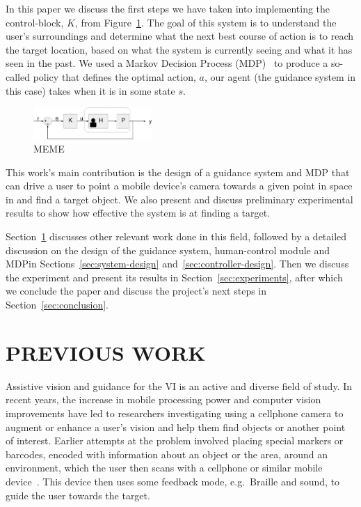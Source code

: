\documentclass[a4paper, twoside]{article}
\begin{document}
In this paper we discuss the first steps we have taken into implementing the control-block, $K$, from Figure~\ref{fig:control-loop}. The goal of this system is to understand the user's surroundings and determine what the next best course of action is to reach the target location, based on what the system is currently seeing and what it has seen in the past. We used a Markov Decision Process (MDP)~\cite{bellman1957markovian} to produce a so-called policy that defines the optimal action, $a$, our agent (the guidance system in this case) takes when it is in some state $s$.  

\begin{figure}
  \centering
  \includegraphics[width=0.4\textwidth]{figures/control_loop.png}
  \caption{MEME}\label{fig:control-loop}
\end{figure}


This work's main contribution is the design of a guidance system and MDP that can drive a user to point a mobile device's camera towards a given point in space in and find a target object. We also present and discuss preliminary experimental results to show how effective the system is at finding a target.

Section~\ref{sec:previous-work} discusses other relevant work done in this field, followed by a detailed discussion on the design of the guidance system, human-control module and MDP\@ in Sections~\ref{sec:system-design} and~\ref{sec:controller-design}. Then we discuss the experiment and present its results in Section~\ref{sec:experiments}, after which we conclude the paper and discuss the project's next steps in Section~\ref{sec:conclusion}. 

\section{\uppercase{Previous Work}}\label{sec:previous-work}

\noindent Assistive vision and guidance for the VI is an active and diverse field of study. In recent years, the increase in mobile processing power and computer vision improvements have led to researchers investigating using a cellphone camera to augment or enhance a user's vision and help them find objects or another point of interest. Earlier attempts at the problem involved placing special markers or barcodes, encoded with information about an object or the area, around an environment, which the user then scans with a cellphone or similar mobile device~\cite{gude2013blind,iannizzotto2005badge3d,manduchi2012mobile}. This device then uses some feedback mode, e.g.\ Braille and sound, to guide the user towards the target. %
\end{document}
